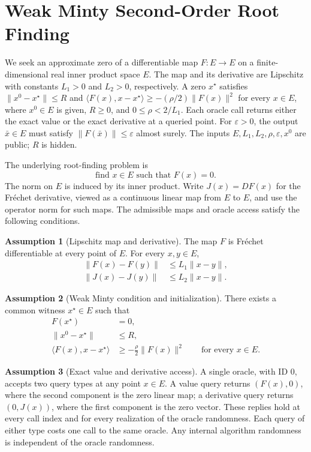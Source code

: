\documentclass[10pt]{article}
\theoremstyle{definition}
\newtheorem{assumption}{Assumption}
\begin{document}
\section*{Weak Minty Second-Order Root Finding}
We seek an approximate zero of a differentiable map $F:E\to E$ on a finite-dimensional real inner product space $E$. The map and its derivative are Lipschitz with constants $L_1>0$ and $L_2>0$, respectively. A zero $x^\star$ satisfies $\|x^0-x^\star\|\leq R$ and $\langle F(x),x-x^\star\rangle\geq-(\rho/2)\|F(x)\|^2$ for every $x\in E$, where $x^0\in E$ is given, $R\geq0$, and $0\leq\rho<2/L_1$. Each oracle call returns either the exact value or the exact derivative at a queried point. For $\varepsilon>0$, the output $\bar{x}\in E$ must satisfy $\|F(\bar{x})\|\leq\varepsilon$ almost surely. The inputs $E,L_1,L_2,\rho,\varepsilon,x^0$ are public; $R$ is hidden.

The underlying root-finding problem is
\[
\text{find }x\in E\text{ such that }F(x)=0.
\]
The norm on $E$ is induced by its inner product. Write $J(x)=DF(x)$ for the Fr\'echet derivative, viewed as a continuous linear map from $E$ to $E$, and use the operator norm for such maps. The admissible maps and oracle access satisfy the following conditions.

\begin{assumption}[Lipschitz map and derivative]
The map $F$ is Fr\'echet differentiable at every point of $E$. For every $x,y\in E$,
\[
\begin{aligned}
\|F(x)-F(y)\| &\leq L_1\|x-y\|,\\
\|J(x)-J(y)\| &\leq L_2\|x-y\|.
\end{aligned}
\]
\end{assumption}

\begin{assumption}[Weak Minty condition and initialization]
There exists a common witness $x^\star\in E$ such that
\[
\begin{aligned}
F(x^\star)&=0,\\
\|x^0-x^\star\|&\leq R,\\
\langle F(x),x-x^\star\rangle
&\geq-\frac{\rho}{2}\|F(x)\|^2
\qquad\text{for every }x\in E.
\end{aligned}
\]
\end{assumption}

\begin{assumption}[Exact value and derivative access]
A single oracle, with ID $0$, accepts two query types at any point $x\in E$. A value query returns $(F(x),0)$, where the second component is the zero linear map; a derivative query returns $(0,J(x))$, where the first component is the zero vector. These replies hold at every call index and for every realization of the oracle randomness. Each query of either type costs one call to the same oracle. Any internal algorithm randomness is independent of the oracle randomness.
\end{assumption}
\end{document}
